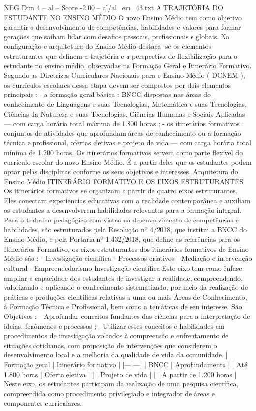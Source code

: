 \begin{textsample}{NEG Dim 4 – al – Score -2.00 – al/al\_em\_43.txt}  \label{ex:f4_neg_243}
A TRAJETÓRIA DO ESTUDANTE NO ENSINO MÉDIO O novo Ensino Médio tem como objetivo garantir o desenvolvimento de competências, habilidades e valores para formar gerações que saibam lidar com desafios pessoais, profissionais e globais.
Na configuração e arquitetura do Ensino Médio destaca -se os elementos estruturantes que definem a trajetória e a perspectiva de flexibilização para o estudante no ensino médio, observadas na Formação Geral e Itinerário Formativo.
Segundo as Diretrizes Curriculares Nacionais para o Ensino Médio ( DCNEM ), os currículos escolares dessa etapa devem ser compostos por dois elementos principais : - a formação geral básica : BNCC dispostas nas áreas do conhecimento de Linguagens e suas Tecnologias, Matemática e suas Tecnologias, Ciências da Natureza e suas Tecnologias, Ciências Humanas e Sociais Aplicadas — com carga horária total máxima de 1.800 horas ; - os itinerários formativos : conjuntos de atividades que aprofundam áreas de conhecimento ou a formação técnica e profissional, ofertas eletivas e projeto de vida — com carga horária total mínima de 1.200 horas.
Os itinerários formativos servem como parte flexível do currículo escolar do novo Ensino Médio.
É a partir deles que os estudantes podem optar pelas disciplinas conforme os seus objetivos e interesses.
Arquitetura do Ensino Médio ITINERÁRIO FORMATIVO E OS EIXOS ESTRUTURANTES Os itinerários formativos se organizam a partir de quatro eixos estruturantes.
Eles conectam experiências educativas com a realidade contemporânea e auxiliam os estudantes a desenvolverem habilidades relevantes para a formação integral.
Para o trabalho pedagógico com vistas no desenvolvimento de competências e habilidades, são estruturados pela Resolução nº 4/2018, que institui a BNCC do Ensino Médio, e pela Portaria nº 1.432/2018, que define as referências para os Itinerários Formativo, os eixos estruturantes dos itinerários formativos do Ensino Médio são : - Investigação científica - Processos criativos - Mediação e intervenção cultural - Empreendedorismo Investigação científica Este eixo tem como ênfase ampliar a capacidade dos estudantes de investigar a realidade, compreendendo, valorizando e aplicando o conhecimento sistematizado, por meio da realização de práticas e produções científicas relativas a uma ou mais Áreas de Conhecimento, à Formação Técnica e Profissional, bem como a temáticas de seu interesse.
São Objetivos : - Aprofundar conceitos fundantes das ciências para a interpretação de ideias, fenômenos e processos ; - Utilizar esses conceitos e habilidades em procedimentos de investigação voltados à compreensão e enfrentamento de situações cotidianas, com proposição de intervenções que considerem o desenvolvimento local e a melhoria da qualidade de vida da comunidade. | Formação geral | Itinerário formativo | |---|---| | BNCC | Aprofundamento | | Até 1.800 horas | Oferta eletiva | | | Projeto de vida | | | A partir de 1.200 horas | Neste eixo, os estudantes participam da realização de uma pesquisa científica, compreendida como procedimento privilegiado e integrador de áreas e componentes curriculares.

\end{textsample}
